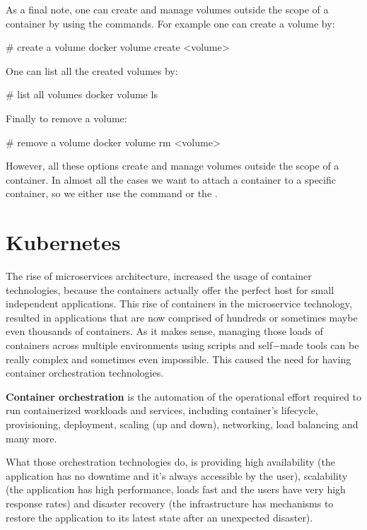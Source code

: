 As a final note, one can create and manage volumes outside the scope of a container by using the 
commands. For example one can create a volume by:

\begin{bash}
# create a volume
docker volume create <volume>
\end{bash}

One can list all the created volumes by:

\begin{bash}
# list all volumes
docker volume ls
\end{bash}

Finally to remove a volume:

\begin{bash}
# remove a volume
docker volume rm <volume>
\end{bash}

However, all these options create and manage volumes outside the scope of a container. In almost all the cases we
want to attach a container to a specific container, so we either use the  command or the
.

\newpage

\section{Kubernetes}


The rise of microservices architecture, increased the usage of container technologies, because the containers
actually offer the perfect host for small independent applications. This rise of containers in the microservice
technology, resulted in applications that are now comprised of hundreds or sometimes maybe even thousands of
containers. As it makes sense, managing those loads of containers across multiple environments using scripts and
self$-$made tools can be really complex and sometimes even impossible. This caused the need for having container
orchestration technologies.

\textbf{Container orchestration} is the automation of the operational effort required to run containerized workloads
and services, including container's lifecycle, provisioning, deployment, scaling (up and down), networking, load
balancing and many more.
\ed

What those orchestration technologies do, is providing high availability (the application has no downtime and it's
always accessible by the user), scalability (the application has high performance, loads fast and the users have very
high response rates) and disaster recovery (the infrastructure has mechanisms to restore the application to its
latest state after an unexpected disaster).

